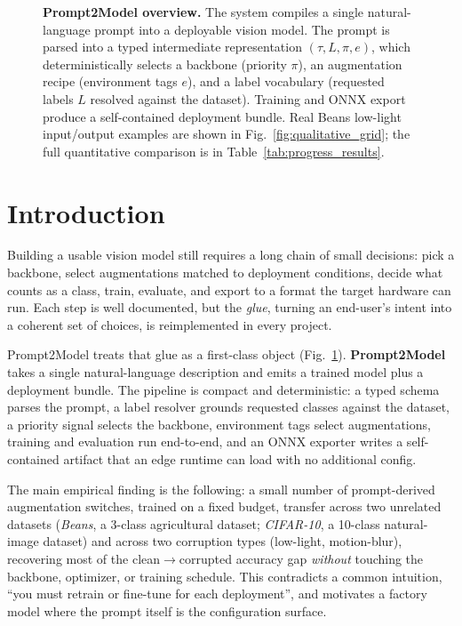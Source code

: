 \documentclass[10pt,twocolumn,letterpaper]{article}
\begin{document}
\begin{figure}[t]
{\begin{tikzpicture}
        \end{tikzpicture}}
    \caption{\textbf{Prompt2Model overview.} The system compiles a single
        natural-language prompt into a deployable vision model. The prompt is
        parsed into a typed intermediate representation $(\tau, L, \pi, e)$, which
        deterministically selects a backbone (priority $\pi$), an augmentation
        recipe (environment tags $e$), and a label vocabulary (requested
        labels $L$ resolved against the dataset). Training and ONNX export
        produce a self-contained deployment bundle. Real Beans low-light
        input/output examples are shown in Fig.~\ref{fig:qualitative_grid};
        the full quantitative comparison is in
        Table~\ref{tab:progress_results}.}
    \label{fig:overview}
\end{figure}

\suppressfloats[t]

\section{Introduction}
Building a usable vision model still requires a long chain of small
decisions: pick a backbone, select augmentations matched to deployment
conditions, decide what counts as a class, train, evaluate, and export
to a format the target hardware can run. Each step is well documented,
but the \emph{glue}, turning an end-user's intent into a coherent set
of choices, is reimplemented in every project.

Prompt2Model treats that glue as a first-class object (Fig.~\ref{fig:overview}).
\textbf{Prompt2Model}
takes a single natural-language description and emits a trained model
plus a deployment bundle. The pipeline is compact and deterministic: a typed schema parses the prompt, a label resolver
grounds requested classes against the dataset, a priority signal
selects the backbone, environment tags select augmentations, training
and evaluation run end-to-end, and an ONNX exporter writes a
self-contained artifact that an edge runtime can load with no
additional config.

The main empirical finding is the following: a small number of prompt-derived augmentation switches,
trained on a fixed budget, transfer across two unrelated
datasets (\emph{Beans}, a 3-class agricultural dataset; \emph{CIFAR-10},
a 10-class natural-image dataset) and across two corruption types
(low-light, motion-blur), recovering most of the clean$\to$corrupted
accuracy gap \emph{without} touching the backbone, optimizer, or
training schedule. This contradicts a common intuition, ``you must
retrain or fine-tune for each deployment'', and motivates a factory
model where the prompt itself is the configuration surface.
\end{document}
